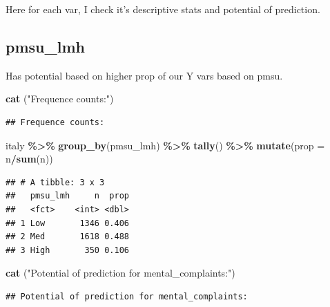 \documentclass[
]{article}
\newenvironment{Shaded}{\begin{snugshade}}{\end{snugshade}}
\newcommand{\AttributeTok}[1]{\textcolor[rgb]{0.13,0.29,0.53}{#1}}
\newcommand{\FunctionTok}[1]{\textcolor[rgb]{0.13,0.29,0.53}{\textbf{#1}}}
\newcommand{\NormalTok}[1]{#1}
\newcommand{\SpecialCharTok}[1]{\textcolor[rgb]{0.81,0.36,0.00}{\textbf{#1}}}
\newcommand{\StringTok}[1]{\textcolor[rgb]{0.31,0.60,0.02}{#1}}
\begin{document}
Here for each var, I check it's descriptive stats and potential of
prediction.

\subsection{pmsu\_lmh}\label{pmsu_lmh}

Has potential based on higher prop of our Y vars based on pmsu.

\begin{Shaded}
\begin{Highlighting}[]
\FunctionTok{cat}\NormalTok{ (}\StringTok{"Frequence counts:"}\NormalTok{)}
\end{Highlighting}
\end{Shaded}

\begin{verbatim}
## Frequence counts:
\end{verbatim}

\begin{Shaded}
\begin{Highlighting}[]
\NormalTok{italy }\SpecialCharTok{\%\textgreater{}\%}
  \FunctionTok{group\_by}\NormalTok{(pmsu\_lmh) }\SpecialCharTok{\%\textgreater{}\%}
  \FunctionTok{tally}\NormalTok{() }\SpecialCharTok{\%\textgreater{}\%}
  \FunctionTok{mutate}\NormalTok{(}\AttributeTok{prop =}\NormalTok{ n}\SpecialCharTok{/}\FunctionTok{sum}\NormalTok{(n))}
\end{Highlighting}
\end{Shaded}

\begin{verbatim}
## # A tibble: 3 x 3
##   pmsu_lmh     n  prop
##   <fct>    <int> <dbl>
## 1 Low       1346 0.406
## 2 Med       1618 0.488
## 3 High       350 0.106
\end{verbatim}

\begin{Shaded}
\begin{Highlighting}[]
\FunctionTok{cat}\NormalTok{ (}\StringTok{"Potential of prediction for mental\_complaints:"}\NormalTok{)}
\end{Highlighting}
\end{Shaded}

\begin{verbatim}
## Potential of prediction for mental_complaints:
\end{verbatim}
\end{document}
